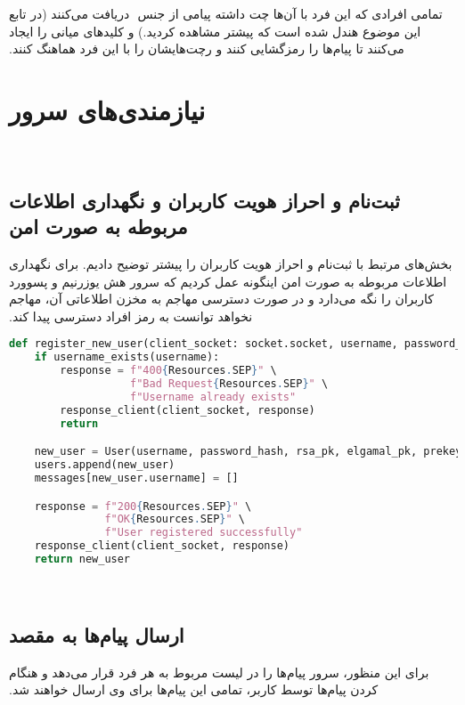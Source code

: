 ‫تمامی افرادی که این فرد با آن‌ها چت داشته پیامی از جنس 
‫ دریافت می‌کنند (در تابع  این موضوع هندل شده است که پیشتر مشاهده کردید.) و کلیدهای میانی را ایجاد می‌کنند تا پیام‌ها را رمزگشایی کنند و رچت‌هایشان را با این فرد هماهنگ کنند.
‫
‫\section{نیازمندی‌های سرور}
‫\subsection{ثبت‌نام و احراز هویت کاربران و نگهداری اطلاعات مربوطه به صورت امن}
‫بخش‌های مرتبط با ثبت‌نام و احراز هویت کاربران را پیشتر توضیح دادیم. برای نگهداری اطلاعات مربوطه به صورت امن اینگونه عمل کردیم که سرور هش یوزرنیم و پسوورد کاربران را نگه می‌دارد و در صورت دسترسی مهاجم به مخزن اطلاعاتی آن، مهاجم نخواهد توانست به رمز افراد دسترسی پیدا کند.
‫
\begin{latin}
\begin{lstlisting}[firstnumber=73, language=Python]
def register_new_user(client_socket: socket.socket, username, password_hash, rsa_pk, elgamal_pk, prekey_pk):
    if username_exists(username):
        response = f"400{Resources.SEP}" \
                   f"Bad Request{Resources.SEP}" \
                   f"Username already exists"
        response_client(client_socket, response)
        return

    new_user = User(username, password_hash, rsa_pk, elgamal_pk, prekey_pk)
    users.append(new_user)
    messages[new_user.username] = []

    response = f"200{Resources.SEP}" \
               f"OK{Resources.SEP}" \
               f"User registered successfully"
    response_client(client_socket, response)
    return new_user
\end{lstlisting}
\end{latin}
‫
‫
‫\subsection{ارسال پیام‌ها به مقصد}
‫برای این منظور، سرور پیام‌ها را در لیست مربوط به هر فرد قرار می‌دهد و هنگام  کردن پیام‌ها توسط کاربر، تمامی این پیام‌ها برای وی ارسال خواهند شد.
‫
